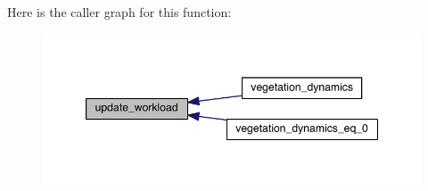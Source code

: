 Here is the caller graph for this function\+:\nopagebreak
\begin{figure}[H]
\begin{center}
\leavevmode
\includegraphics[width=347pt]{update__derived__props_8f90_a26e0b3f2eb056299270873a3a87f17c7_icgraph}
\end{center}
\end{figure}


